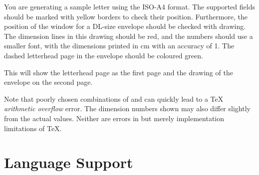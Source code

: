 \begin{Example}
  You are generating a sample letter using the ISO-A4 format. The supported
  fields should be marked with yellow borders to check their position.
  Furthermore, the position of the window for a DL-size envelope should be
  checked with drawing. The dimension lines in this drawing should be red, and
  the numbers should use a smaller font, with the dimensions printed in cm
  with an accuracy of 1. The dashed letterhead page in the envelope
  should be coloured green.
  This will show the letterhead page as the first page and the drawing of the
  envelope on the second page.
\end{Example}

Note that poorly chosen combinations of  and
 can quickly lead to a \TeX{} \emph{arithmetic overflow}
error. The dimension numbers shown may also differ slightly from the actual
values. Neither are errors in  but merely implementation
limitations of \TeX.
%
\EndIndexGroup
%
\EndIndexGroup
%
\EndIndexGroup


\section{Language Support}
%
\BeginIndexGroup
{}%

